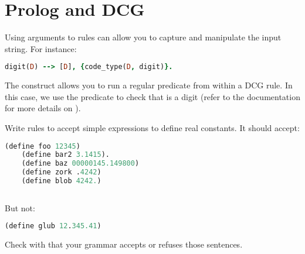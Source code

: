 \documentclass{../../../tp}
\begin{document}
\section{Prolog and DCG}

Using arguments to rules can allow you to capture and manipulate the input string. For instance:
\begin{lstlisting}[language=prolog]
digit(D) --> [D], {code_type(D, digit)}.
\end{lstlisting}

The  construct allows you to run a regular \prolog predicate from within a DCG rule. In this case, we use the  predicate to check that  is a digit (refer to the documentation for more details on ).

\begin{instruction}
	Write rules to accept simple \scheme expressions to define real constants. It should accept:
	
	\begin{lstlisting}[language=lisp]
	(define foo 12345)
	(define bar2 3.1415).
	(define baz 00000145.149800)
	(define zork .4242)
	(define blob 4242.)
	
	\end{lstlisting}
	
	But not: 
	
	\begin{lstlisting}[language=lisp]
	(define glub 12.345.41)
	\end{lstlisting}
	
	Check with  that your grammar accepts or refuses those sentences.
\end{instruction}  

	
\end{document}
